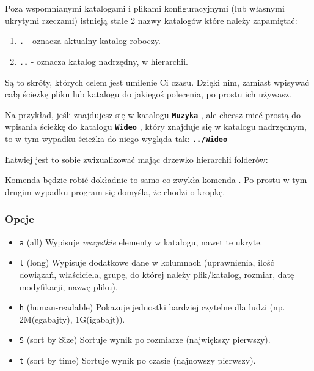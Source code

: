 \documentclass[12pt]{article}
\newcommand{\ttbf}[1]{
    \texttt{\textbf{#1}}
}
\begin{document}
Poza wspomnianymi katalogami i plikami konfiguracyjnymi (lub własnymi ukrytymi rzeczami) istnieją stałe 2 nazwy katalogów które należy zapamiętać:
\begin{enumerate}
    \item \ttbf{.} - oznacza aktualny katalog roboczy.
    \item \ttbf{..} - oznacza katalog nadrzędny,  w hierarchii.
\end{enumerate}

Są to skróty, których celem jest umilenie Ci czasu. Dzięki nim, zamiast wpisywać całą ścieżkę pliku lub katalogu do jakiegoś polecenia, po prostu ich używasz.

Na przykład, jeśli znajdujesz się w katalogu \ttbf{Muzyka}, ale chcesz mieć prostą do wpisania ścieżkę do katalogu \ttbf{Wideo}, który znajduje się w katalogu nadrzędnym, to w tym wypadku ścieżka do niego wygląda tak: \ttbf{../Wideo}

Łatwiej jest to sobie zwizualizować mając drzewko hierarchii folderów:

\hfill

Komenda \say{\ttbf{ls .}} będzie robić dokładnie to samo co zwykła komenda \say{\ttbf{ls}}. Po prostu w tym drugim wypadku program się domyśla, że chodzi o kropkę.

\subsubsection{Opcje}
\begin{itemize}
    \item \texttt{a} (all) Wypisuje \emph{wszystkie} elementy w katalogu, nawet te ukryte.
    \item \texttt{l} (long) Wypisuje dodatkowe dane w kolumnach (uprawnienia, ilość dowiązań, właściciela, grupę, do której należy plik/katalog, rozmiar, datę modyfikacji, nazwę pliku).
    \item \texttt{h} (human-readable) Pokazuje jednostki bardziej czytelne dla ludzi (np. 2M(egabajty), 1G(igabajt)).
    \item \texttt{S} (sort by Size) Sortuje wynik po rozmiarze (największy pierwszy).
    \item \texttt{t} (sort by time) Sortuje wynik po czasie (najnowszy pierwszy).
\end{itemize}
\end{document}
